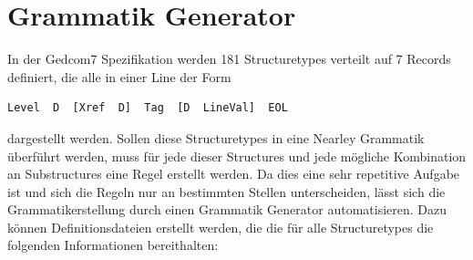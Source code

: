 \section{Grammatik Generator}
\label{sec: Konzept - Grammatik Generator}
In der Gedcom7 Spezifikation werden 181 Structuretypes verteilt auf 7 Records definiert, die alle in einer Line der Form
\begin{lstlisting}[frame=none]
	Level  D  [Xref  D]  Tag  [D  LineVal]  EOL
\end{lstlisting}
dargestellt werden. Sollen diese Structuretypes in eine Nearley Grammatik überführt werden, muss für jede dieser Structures und jede mögliche Kombination an Substructures eine Regel erstellt werden. Da dies eine sehr repetitive Aufgabe ist und sich die Regeln nur an bestimmten Stellen unterscheiden, lässt sich die Grammatikerstellung durch einen Grammatik Generator automatisieren. Dazu können Definitionsdateien erstellt werden, die die für alle Structuretypes die folgenden Informationen bereithalten: 
